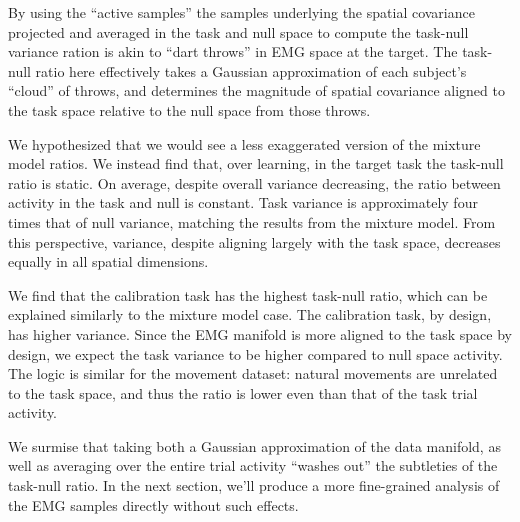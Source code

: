 \documentclass[../main.tex]{subfiles}
\begin{document}
  By using the ``active samples'' the samples underlying the spatial covariance projected and averaged in the task and null space to compute the task-null variance ration is akin to ``dart throws'' in EMG space at the target. The task-null ratio here effectively takes a Gaussian approximation of each subject's ``cloud'' of throws, and determines the magnitude of spatial covariance aligned to the task space relative to the null space from those throws.
  
  We hypothesized that we would see a less exaggerated version of the mixture model ratios. We instead find that, over learning, in the target task the task-null ratio is static. On average, despite overall variance decreasing, the ratio between activity in the task and null is constant. Task variance is approximately four times that of null variance, matching the results from the mixture model. From this perspective, variance, despite aligning largely with the task space, decreases equally in all spatial dimensions.
  
  We find that the calibration task has the highest task-null ratio, which can be explained similarly to the mixture model case. The calibration task, by design, has higher variance. Since the EMG manifold is more aligned to the task space by design, we expect the task variance to be higher compared to null space activity. The logic is similar for the movement dataset: natural movements are unrelated to the task space, and thus the ratio is lower even than that of the task trial activity.
  
  We surmise that taking both a Gaussian approximation of the data manifold, as well as averaging over the entire trial activity ``washes out'' the subtleties of the task-null ratio. In the next section, we'll produce a more fine-grained analysis of the EMG samples directly without such effects.


  
\end{document}
